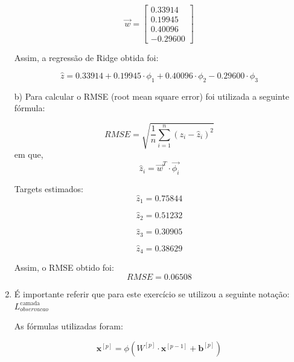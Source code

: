 \documentclass[a4paper,12pt]{article} %
\begin{document}
\begin{enumerate}
\begin{equation*}
    \vec{w} = \begin{bmatrix}  0.33914 \\ 0.19945 \\ 0.40096 \\ -0.29600 \end{bmatrix}
\end{equation*}

Assim, a regressão de Ridge obtida foi:

\begin{equation*}  
    \hat{z} = 0.33914 + 0.19945 \cdot \phi_1 + 0.40096 \cdot \phi_2 - 0.29600 \cdot \phi_3
\end{equation*}

b)
Para calcular o RMSE (root mean square error) foi utilizada a seguinte fórmula:

\begin{equation}
    RMSE = \sqrt{\frac{1}{n} \sum_{i=1}^{n} (z_i - \hat{z}_i)^2}
\end{equation}
em que,
\begin{equation}
    \hat{z}_i = \vec{w}^T \cdot \vec{\phi_i}
\end{equation}
 
Targets estimados:
\begin{equation*}
    \hat{z}_1 = 0.75844
\end{equation*}

\begin{equation*}
    \hat{z}_2 = 0.51232
\end{equation*}

\begin{equation*}
    \hat{z}_3 = 0.30905
\end{equation*}

\begin{equation*}
    \hat{z}_4 = 0.38629
\end{equation*}

Assim, o RMSE obtido foi:
\begin{equation*}
    RMSE = 0.06508
\end{equation*}

\item
É importante referir que para este exercício se utilizou a seguinte notação: $L^{\text{camada}}_{observacao}$

As fórmulas utilizadas foram:

\begin{equation}
    \textbf{x}^{[p]} = \phi({W}^{[p]} \cdot \textbf{x}^{[p-1]} + \textbf{b}^{[p]})
\end{equation}


\end{enumerate}
\end{document}
